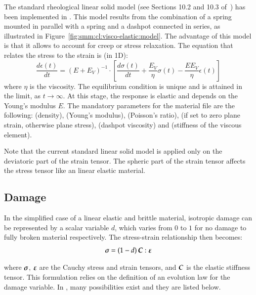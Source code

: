 The standard rheological linear solid model (see Sections 10.2 and 10.3
of~\cite{simo92}) has been implemented in \akantu. This model results from the
combination of a spring mounted in parallel with a spring and a dashpot
connected in series, as illustrated in
Figure~\ref{fig:smm:cl:visco-elastic:model}. The advantage of this model is that
it allows to account for creep or stress relaxation. The equation that relates
the stress to the strain is (in 1D):
\begin{equation}
  \frac{d\epsilon(t)}{dt} = \left ( E + E_V \right ) ^ {-1} \cdot \left [ \frac{d\sigma(t)}{dt} + \frac{E_V}{\eta}\sigma(t) - \frac{EE_V}{\eta}\epsilon(t) \right ]
\end{equation}
where $\eta$ is the viscosity. The equilibrium condition is unique and
is attained in the limit, as $t \to \infty $. At this stage, the
response is elastic and depends on the Young's modulus $E$.  The
mandatory parameters for the material file are the following:
 (density),  (Young's modulus),  (Poisson's
ratio),  (if set to zero plane strain, otherwise
plane stress),  (dashpot viscosity) and  (stiffness
of the viscous element).

Note that the current standard linear solid model is applied only on the deviatoric part of the strain tensor. The spheric part of the strain tensor affects the stress tensor like an linear elastic material.

\subsection{Damage}

In the  simplified case of a  linear elastic and brittle  material, isotropic
damage can be represented by a scalar variable $d$, which varies from $0$ to $1$
for  no  damage  to  fully  broken  material  respectively.  The  stress-strain
relationship then becomes:
\begin{equation*}
  \boldsymbol{\sigma} = (1-d)\, \boldsymbol{C}:\boldsymbol{\varepsilon}
\end{equation*}

where  $\boldsymbol{\sigma}$,  $\boldsymbol{\varepsilon}$ are  the  Cauchy  stress and  strain
tensors, and $\boldsymbol{C}$ is the elastic stiffness tensor. This formulation relies
on the definition of an evolution law for the damage variable. In \akantu, many
possibilities exist and they are listed below.

